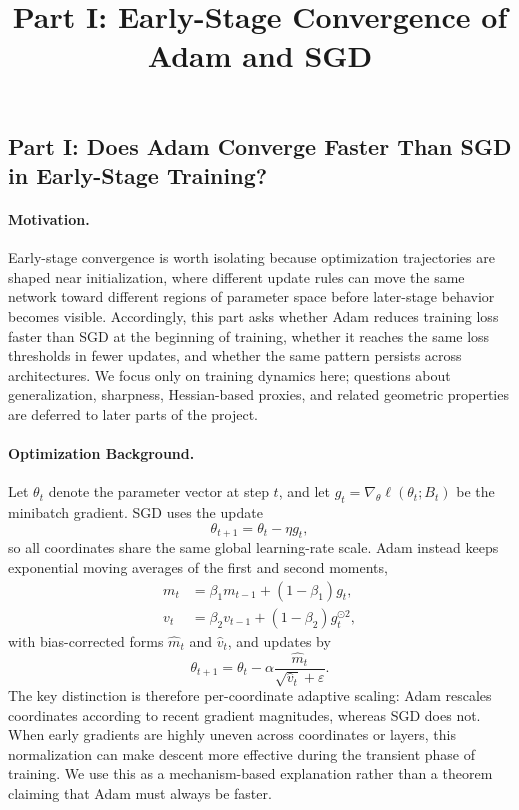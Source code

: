 \documentclass[11pt]{article}
\title{Part I: Early-Stage Convergence of Adam and SGD}
\author{}
\date{}
\begin{document}
\maketitle

\subsection{Part I: Does Adam Converge Faster Than SGD in Early-Stage Training?}

\paragraph{Motivation.}
Early-stage convergence is worth isolating because optimization trajectories are shaped near initialization, where different update rules can move the same network toward different regions of parameter space before later-stage behavior becomes visible. Accordingly, this part asks whether Adam reduces training loss faster than SGD at the beginning of training, whether it reaches the same loss thresholds in fewer updates, and whether the same pattern persists across architectures. We focus only on training dynamics here; questions about generalization, sharpness, Hessian-based proxies, and related geometric properties are deferred to later parts of the project.

\paragraph{Optimization Background.}
Let $\theta_t$ denote the parameter vector at step $t$, and let $g_t=\nabla_\theta \ell(\theta_t;B_t)$ be the minibatch gradient. SGD uses the update
\[
\theta_{t+1}=\theta_t-\eta g_t,
\]
so all coordinates share the same global learning-rate scale. Adam instead keeps exponential moving averages of the first and second moments,
\begin{align*}
m_t &= \beta_1 m_{t-1} + (1-\beta_1) g_t, \\
v_t &= \beta_2 v_{t-1} + (1-\beta_2) g_t^{\odot 2},
\end{align*}
with bias-corrected forms $\hat m_t$ and $\hat v_t$, and updates by
\[
\theta_{t+1}=\theta_t-\alpha \frac{\hat m_t}{\sqrt{\hat v_t}+\varepsilon}.
\]
The key distinction is therefore per-coordinate adaptive scaling: Adam rescales coordinates according to recent gradient magnitudes, whereas SGD does not. When early gradients are highly uneven across coordinates or layers, this normalization can make descent more effective during the transient phase of training. We use this as a mechanism-based explanation rather than a theorem claiming that Adam must always be faster.
\end{document}
